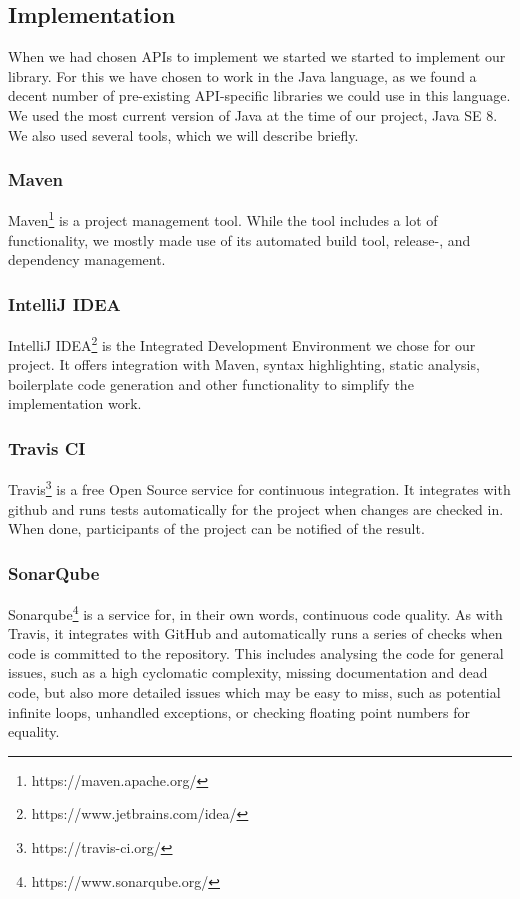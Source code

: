 \documentclass{sigchi-alternate}
\begin{document}
\subsection{Implementation}
When we had chosen APIs to implement we started we started to implement our library. For this we have chosen to work in the Java language, as we found a decent
number of pre-existing API-specific libraries we could use in this language. We used the most current version of Java at the time of our project, Java SE 8. We also used several
tools, which we will describe briefly.
\subsubsection{Maven}
Maven\footnote{https://maven.apache.org/} is a project management tool. While the tool includes a lot of functionality, we mostly made use of its automated build tool, release-, and
dependency management.
\subsubsection{IntelliJ IDEA}
IntelliJ IDEA\footnote{https://www.jetbrains.com/idea/} is the Integrated Development Environment we chose for our project. It offers integration with Maven, syntax highlighting,
static analysis, boilerplate code generation and other functionality to simplify the implementation work.
\subsubsection{Travis CI}
Travis\footnote{https://travis-ci.org/} is a free Open Source service for continuous integration. It integrates with github and runs tests automatically for the project when changes are
checked in. When done, participants of the project can be notified of the result.
\subsubsection{SonarQube}
Sonarqube\footnote{https://www.sonarqube.org/} is a service for, in their own words, continuous code quality. As with Travis, it integrates with GitHub and automatically runs a series of
checks when code is committed to the repository. This includes analysing the code for general issues, such as a high cyclomatic complexity, missing documentation and dead code, but also
more detailed issues which may be easy to miss, such as potential infinite loops, unhandled exceptions, or checking floating point numbers for equality.
\end{document}
